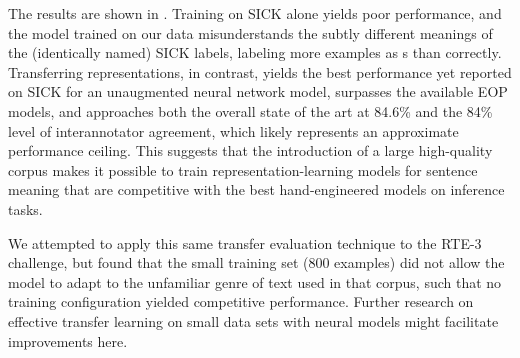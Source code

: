 The results are shown in . Training on SICK alone yields poor performance, and the model trained on our data misunderstands the subtly different meanings of the (identically named) SICK labels, labeling more  examples as s than correctly. Transferring representations, in contrast, yields the best performance yet reported on SICK for an unaugmented neural network model, surpasses the available EOP models, and approaches both the overall state of the art at 84.6\% \cite{lai2014illinois} and the 84\% level of interannotator agreement, which likely represents an approximate performance ceiling. This suggests that the introduction of a large high-quality corpus makes it  possible to train representation-learning models for sentence meaning that are competitive with the best hand-engineered models on inference tasks.

We attempted to apply this same transfer evaluation technique to the RTE-3 challenge, but found that the small training set (800 examples) did not allow the model to adapt to the unfamiliar genre of text used in that corpus, such that no training configuration yielded competitive performance.
Further research on effective transfer learning on small data sets with neural models might facilitate improvements here.



